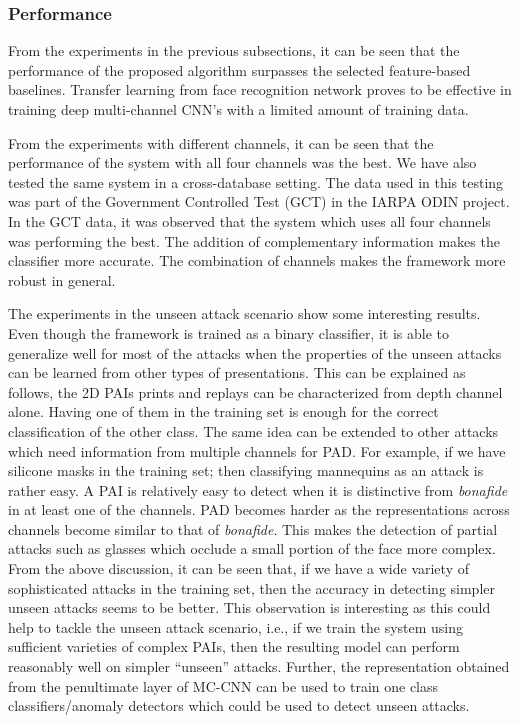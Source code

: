 \documentclass[journal]{IEEEtran}
\begin{document}
\subsubsection{Performance}

From the experiments in the previous subsections, it can be seen that the performance of the proposed algorithm surpasses the selected feature-based baselines. Transfer learning from face recognition network proves to be effective in training deep multi-channel CNN's with a limited amount of training data.

From the experiments with different channels, it can be seen that the performance of the system with all four channels was the best. We have also tested the same system in a cross-database setting. The data used in this testing was part of the Government Controlled Test (GCT) in the IARPA ODIN \cite{ODIN} project. In the GCT data, it was observed that the system which uses all four channels was performing the best. The addition of complementary information makes the classifier more accurate. The combination of channels makes the framework more robust in general.

The experiments in the unseen attack scenario show some interesting results. Even though the framework is trained as a binary classifier, it is able to generalize well for most of the attacks when the properties of the unseen attacks can be learned from other types of presentations. This can be explained as follows, the 2D PAIs prints and replays can be characterized from depth channel alone. Having one of them in the training set is enough for the correct classification of the other class. The same idea can be extended to other attacks which need information from multiple channels for PAD. For example, if we have silicone masks in the training set; then classifying mannequins as an attack is rather easy.
A PAI is relatively easy to detect when it is distinctive from \textit{bonafide} in at least one of the channels. PAD becomes harder as the representations across channels become similar to that of \textit{bonafide}. This makes the detection of partial attacks such as glasses which occlude a small portion of the face more complex. From the above discussion, it can be seen that, if we have a wide variety of sophisticated attacks in the training set, then the accuracy in detecting simpler unseen attacks seems to be better. This observation is interesting as this could help to tackle the unseen attack scenario, i.e., if we train the system using sufficient varieties of complex PAIs, then the resulting model can perform reasonably well on simpler ``unseen'' attacks. Further, the representation obtained from the penultimate layer of MC-CNN can be used to train one class classifiers/anomaly detectors which could be used to detect unseen attacks.
\end{document}
